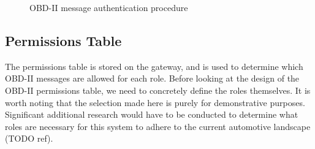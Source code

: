 \begin{figure}[h]
	\centering
	\caption{OBD-II message authentication procedure}
	\label{fig:message_authentication}
\end{figure}

\subsection{Permissions Table} 
\label{subsec:sol_permissions_table}
The permissions table is stored on the gateway, and is used to determine which OBD-II messages are allowed for each role. Before looking at the design of the OBD-II permissions table, we need to concretely define the roles themselves. It is worth noting that the selection made here is purely for demonstrative purposes. Significant additional research would have to be conducted to determine what roles are necessary for this system to adhere to the current automotive landscape (TODO ref).

